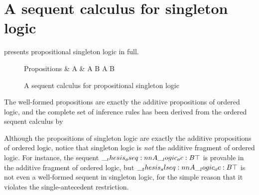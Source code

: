 \section{A sequent calculus for singleton logic}\label{sec:singleton-logic:seq-calc}

 presents propositional singleton logic in full.
%
\begin{figure}[t]
  \begin{syntax*}
    Propositions &
      A & \alpha \mid A \plus B \mid \zero \mid A \with B \mid \top
  \end{syntax*}
  \caption{A sequent calculus for propositional singleton logic\label{fig:singleton-logic:seq-calc}}
\end{figure}
%
The well-formed propositions are exactly the additive propositions of ordered logic, and the complete set of inference rules has been derived from the ordered sequent calculus by 

Although the propositions of singleton logic are exactly the additive propositions of ordered logic, notice that singleton logic is \emph{not} the additive fragment of ordered logic.
For instance, the sequent $\oseq{A \oc B |- \top}$ is provable in the additive fragment of ordered logic, but $\slseq{A \oc B |- \top}$ is not even a well-formed sequent in singleton logic, for the simple reason that it violates the single-antecedent restriction.

